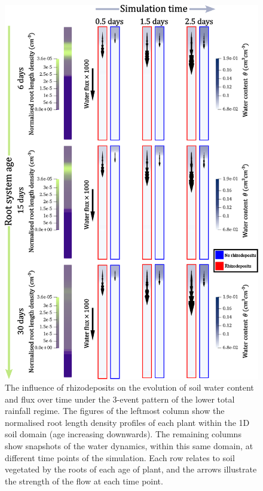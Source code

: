 \documentclass[11pt,a4paper]{article}
\numberwithin{equation}{section}
\begin{document}
\begin{figure}
	\centering
	\includegraphics[width = 0.75\linewidth, keepaspectratio]{almeria_3_events.eps}
	\caption{The influence of rhizodeposits on the evolution of soil water content and flux over time under the 3-event pattern of the lower total rainfall regime. The figures of the leftmost column show the normalised root length density profiles of each plant within the 1D soil domain (age increasing downwards). The remaining columns show snapshots of the water dynamics, within this same domain, at different time points of the simulation. Each row relates to soil vegetated by the roots of each age of plant, and the arrows illustrate the strength of the flow at each time point.}
	\label{figure: almeria_3_events_fluxes}
\end{figure}
\end{document}
